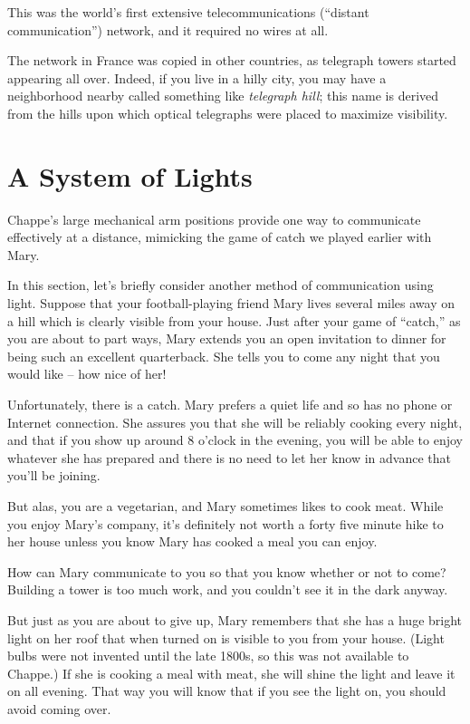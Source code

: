 \documentclass[UTF8]{book}
\begin{document}
\begin{CJK}{UTF8}{gbsn}
This was the world's first extensive telecommunications (``distant communication'') network, and it required no wires at all.

The network in France was copied in other countries, as telegraph towers started appearing all over. Indeed, if you live in a hilly city, you may have a neighborhood nearby called something like \emph{telegraph hill}; this name is derived from the hills upon which optical telegraphs were placed to maximize visibility.

\section{A System of Lights}

Chappe's large mechanical arm positions provide one way to communicate effectively at a distance, mimicking the game of catch we played earlier with Mary.

In this section, let's briefly consider another method of communication using light. Suppose that your football-playing friend Mary lives several miles away on a hill which is clearly visible from your house. Just after your game of ``catch,'' as you are about to part ways, Mary extends you an open invitation to dinner for being such an excellent quarterback. She tells you to come any night that you would like -- how nice of her!

Unfortunately, there is a catch. Mary prefers a quiet life and so has no phone or Internet connection. She assures you that she will be reliably cooking every night, and that if you show up around 8 o'clock in the evening, you will be able to enjoy whatever she has prepared and there is no need to let her know in advance that you'll be joining.

But alas, you are a vegetarian, and Mary sometimes likes to cook meat. While you enjoy Mary's company, it's definitely not worth a forty five minute hike to her house unless you know Mary has cooked a meal you can enjoy.

How can Mary communicate to you so that you know whether or not to come? Building a tower is too much work, and you couldn't see it in the dark anyway.

But just as you are about to give up, Mary remembers that she has a huge bright light on her roof that when turned on is visible to you from your house. (Light bulbs were not invented until the late 1800s, so this was not available to Chappe.) If she is cooking a meal with meat, she will shine the light and leave it on all evening. That way you will know that if you see the light on, you should avoid coming over.


\end{CJK}
\end{document}
